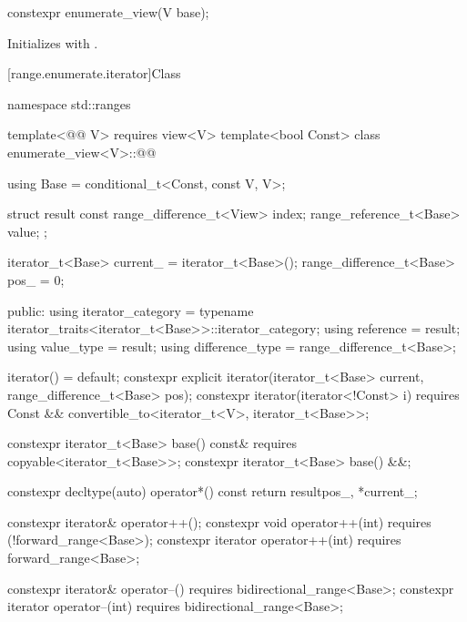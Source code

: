 \documentclass{wg21}
\begin{document}
\begin{itemdecl}
    constexpr enumerate_view(V base);
\end{itemdecl}

\begin{itemdescr}
    \pnum
    \effects
    Initializes  with .
\end{itemdescr}

[range.enumerate.iterator]{Class }

\begin{codeblock}
namespace std::ranges {
    template<@@ V>
    requires view<V>
    template<bool Const>
    class enumerate_view<V>::@@ {
        
        using Base = conditional_t<Const, const V, V>;
        
        struct result {
            const range_difference_t<View> index;
            range_reference_t<Base> value;
        };
    
        iterator_t<Base> current_ = iterator_t<Base>();
        range_difference_t<Base> pos_ = 0;
        
        
      public:
        using iterator_category = typename iterator_traits<iterator_t<Base>>::iterator_category;
        using reference  = result;
        using value_type = result;
        using difference_type = range_difference_t<Base>;
        
        
        iterator() = default;
        constexpr explicit iterator(iterator_t<Base> current, range_difference_t<Base> pos);
        constexpr iterator(iterator<!Const> i)
        requires Const && convertible_to<iterator_t<V>, iterator_t<Base>>;
        
        
        constexpr iterator_t<Base> base() const&
        requires copyable<iterator_t<Base>>;
        constexpr iterator_t<Base> base() &&;
        
        constexpr decltype(auto) operator*() const {
             return result{pos_, *current_};
        }
    
        constexpr iterator& operator++();
        constexpr void operator++(int) requires (!forward_range<Base>);
        constexpr iterator operator++(int) requires forward_range<Base>;
        
        constexpr iterator& operator--() requires bidirectional_range<Base>;
        constexpr iterator operator--(int) requires bidirectional_range<Base>;
        
}}
\end{codeblock}
\end{document}
